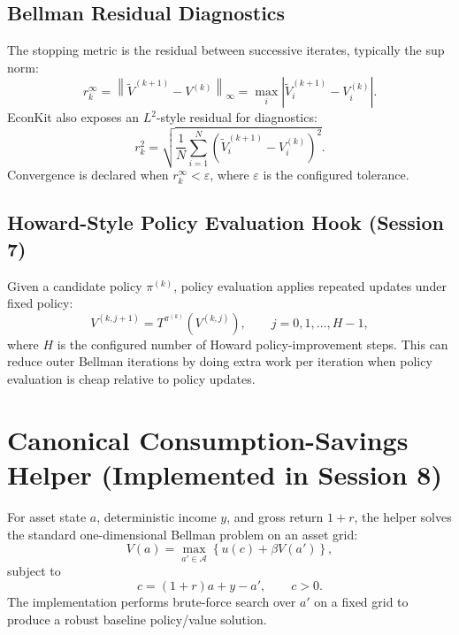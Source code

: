 \documentclass[11pt]{article}
\begin{document}
\subsection{Bellman Residual Diagnostics}
The stopping metric is the residual between successive iterates, typically the
sup norm:
\begin{equation}
    r_k^{\infty} = \left\lVert \widetilde{V}^{(k+1)} - V^{(k)} \right\rVert_{\infty}
    = \max_i \left|\widetilde{V}^{(k+1)}_i - V^{(k)}_i\right|.
\end{equation}
EconKit also exposes an \(L^2\)-style residual for diagnostics:
\begin{equation}
    r_k^{2} = \sqrt{\frac{1}{N} \sum_{i=1}^{N}
    \left(\widetilde{V}^{(k+1)}_i - V^{(k)}_i\right)^2}.
\end{equation}
Convergence is declared when \(r_k^{\infty} < \varepsilon\), where \(\varepsilon\)
is the configured tolerance.

\subsection{Howard-Style Policy Evaluation Hook (Session 7)}
Given a candidate policy \(\pi^{(k)}\), policy evaluation applies repeated
updates under fixed policy:
\begin{equation}
    V^{(k,j+1)} = T^{\pi^{(k)}}\left(V^{(k,j)}\right), \qquad j=0,1,\dots,H-1,
\end{equation}
where \(H\) is the configured number of Howard policy-improvement steps.
This can reduce outer Bellman iterations by doing extra work per iteration
when policy evaluation is cheap relative to policy updates.

\section{Canonical Consumption-Savings Helper (Implemented in Session 8)}
For asset state \(a\), deterministic income \(y\), and gross return \(1+r\),
the helper solves the standard one-dimensional Bellman problem on an asset grid:
\begin{equation}
    V(a) = \max_{a' \in \mathcal{A}} \left\{ u(c) + \beta V(a') \right\},
\end{equation}
subject to
\begin{equation}
    c = (1+r)a + y - a', \qquad c > 0.
\end{equation}
The implementation performs brute-force search over \(a'\) on a fixed grid to
produce a robust baseline policy/value solution.
\end{document}
